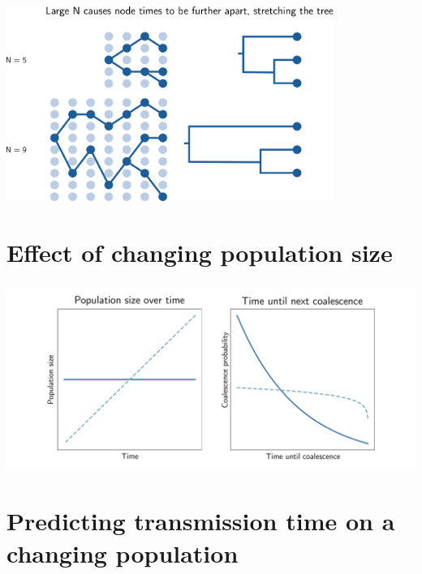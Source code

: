 \documentclass[aspectratio=169]{beamer}
\begin{document}
\begin{frame} \frametitle{\insertsection}

        \centering\includegraphics[width=0.8\textwidth]{images/coalescence}

\end{frame}

\section{Effect of changing population size}

\begin{frame} \frametitle{\insertsection}

    \centering\includegraphics[width=\textwidth]{images/population-comparison}
        

\end{frame}

\section{Predicting transmission time on a changing population}
\end{document}
